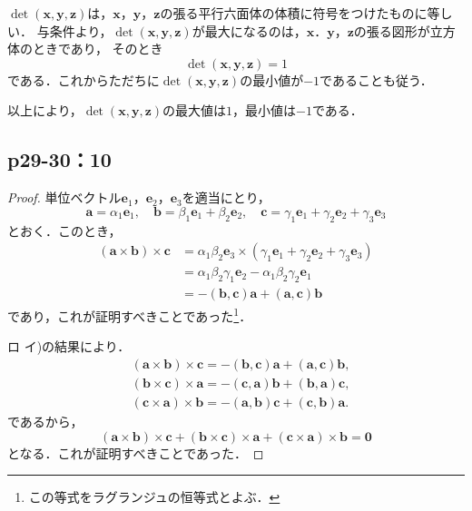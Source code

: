 \documentclass[uplatex,dvipdfmx,a4paper,11pt,fleqn]{jsarticle}
\begin{document}
\begin{tleftbar}
    $ \det (\bm{x},\bm{y},\bm{z})$は，$\bm{x}$，$\bm{y}$，$\bm{z}$の張る平行六面体の体積に符号をつけたものに等しい．
    与条件より，$\det (\bm{x},\bm{y},\bm{z})$が最大になるのは，$\bm{x}$．$\bm{y}$，$\bm{z}$の張る図形が立方体のときであり，
    そのとき
    \[
        \det (\bm{x},\bm{y},\bm{z}) =1
    \]
    である．これからただちに$\det (\bm{x},\bm{y},\bm{z})$の最小値が$-1$であることも従う．

    以上により，$\det (\bm{x},\bm{y},\bm{z})$の最大値は$1$，最小値は$-1$である．
\end{tleftbar}

\subsection*{p29-30：10}

\begin{tleftbar}
    \begin{description}
        \item[イ] 
    \begin{proof}
    単位ベクトル$\bm{e}_1$，$\bm{e}_2$，$\bm{e}_3$を適当にとり，
    \[
    \bm{a} = \alpha_1 \bm{e}_1,\quad \bm{b} = \beta_1 \bm{e}_1+\beta_2 \bm{e}_2,\quad \bm{c}= \gamma_1 \bm{e}_1 + \gamma_2 \bm{e}_2 + \gamma_3 \bm{e}_3
    \]
    とおく．このとき，
        \begin{align*}
            (\bm{a} \times \bm{b}) \times \bm{c} &= \alpha_1 \beta_2 \bm{e}_3 \times (\gamma_1 \bm{e}_1 + \gamma_2 \bm{e}_2 + \gamma_3 \bm{e}_3) \\
            & = \alpha_1 \beta_2 \gamma_1 \bm{e}_2 - \alpha_1 \beta_2 \gamma_2 \bm{e}_1 \\
            & = -(\bm{b},\bm{c})\bm{a}+(\bm{a},\bm{c}) \bm{b}
        \end{align*}
        であり，これが証明すべきことであった\footnote{この等式をラグランジュの恒等式とよぶ．}．
        \item[ロ]
        イ)の結果により．
        \begin{align*} 
                & (\bm{a}\times\bm{b}) \times \bm{c} =  -(\bm{b},\bm{c})\bm{a}+(\bm{a},\bm{c}) \bm{b} ,\\
                & (\bm{b} \times \bm{c} ) \times \bm{a} = -(\bm{c},\bm{a}) \bm{b} +(\bm{b},\bm{a}) \bm{c}, \\
                & (\bm{c} \times \bm{a} ) \times \bm{b} = -(\bm{a},\bm{b}) \bm{c} +(\bm{c},\bm{b}) \bm{a}.
        \end{align*} 
        であるから，
        \[
            (\bm{a}\times\bm{b}) \times \bm{c} + (\bm{b} \times \bm{c} ) \times \bm{a}+(\bm{c} \times \bm{a} ) \times \bm{b} =\bm{0}
        \]
        となる．これが証明すべきことであった．
    \end{proof}
\end{description}
    \end{tleftbar}
\end{document}
